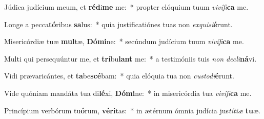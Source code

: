 \item Júdica judícium meum, et \textbf{réd}i\textbf{me} me:~* propter elóquium tuum \textit{vi}\textit{ví}\textit{fi}\textbf{ca} me.
\item Longe a pecca\textbf{tó}ribus \textbf{sa}lus:~* quia justificatiónes tuas non \textit{ex}\textit{qui}\textit{si}\textbf{é}runt.
\item Misericórdiæ tuæ \textbf{mul}tæ, \textbf{Dó}\textbf{mi}ne:~* secúndum judícium tuum \textit{vi}\textit{ví}\textit{fi}\textbf{ca} me.
\item Multi qui persequúntur me, et \textbf{trí}bu\textbf{lant} me:~* a testimóniis tuis \textit{non} \textit{de}\textit{cli}\textbf{ná}vi.
\item Vidi prævaricántes, et \textbf{ta}be\textbf{scé}bam:~* quia elóquia tua non \textit{cus}\textit{to}\textit{di}\textbf{é}runt.
\item Vide quóniam mandáta tua di\textbf{lé}xi, \textbf{Dó}\textbf{mi}ne:~* in misericórdia tua \textit{vi}\textit{ví}\textit{fi}\textbf{ca} me.
\item Princípium verbórum tu\textbf{ó}rum, \textbf{vé}\textbf{ri}tas:~* in ætérnum ómnia judícia jus\textit{tí}\textit{ti}\textit{æ} \textbf{tu}æ.
